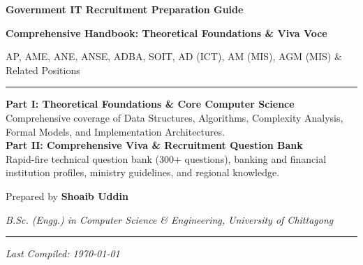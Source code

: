\documentclass[12pt,a4paper]{book}
\begin{document}
\begin{titlepage}
\centering
\vspace*{2.5cm}
{\Huge\bfseries\color{primary} Government IT Recruitment Preparation Guide\par}
\vspace{0.8cm}
{\Large\bfseries\color{accent} Comprehensive Handbook: Theoretical Foundations \& Viva Voce\par}
\vspace{0.5cm}
{\large AP, AME, ANE, ANSE, ADBA, SOIT, AD (ICT), AM (MIS), AGM (MIS) \& Related Positions\par}
\vspace{0.6cm}
{\color{primary}\rule{\textwidth}{1.5pt}\par}
\vspace{1.0cm}
\begin{minipage}{0.88\textwidth}
\begin{center}
{\Large\bfseries\color{primary} Part I: Theoretical Foundations \& Core Computer Science}\\[8pt]
{\large Comprehensive coverage of Data Structures, Algorithms, Complexity Analysis, Formal Models, and Implementation Architectures.}\\[22pt]
{\Large\bfseries\color{primary} Part II: Comprehensive Viva \& Recruitment Question Bank}\\[8pt]
{\large Rapid-fire technical question bank (300+ questions), banking and financial institution profiles, ministry guidelines, and regional knowledge.}
\end{center}
\end{minipage}
\vfill
{\normalsize Prepared by \textbf{Shoaib Uddin}\par}
\vspace{0.3cm}
{\normalsize\itshape B.Sc. (Engg.) in Computer Science \& Engineering, University of Chittagong\par}
\vspace{0.8cm}
{\color{primary}\rule{\textwidth}{0.5pt}\par}
\vspace{0.3cm}
{\small\itshape Last Compiled: \today}
\end{titlepage}

\frontmatter
\pagestyle{plain}
\tableofcontents
\clearpage

\mainmatter
\pagestyle{fancy}
\end{document}
